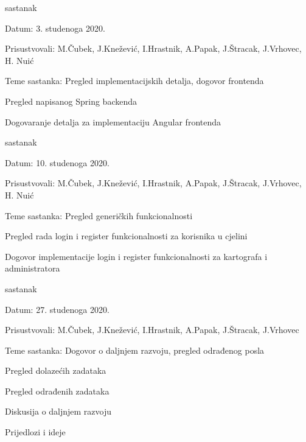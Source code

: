 \begin{packed_enum}
			\item  sastanak
			\item[] \begin{packed_item}
				\item Datum: 3. studenoga 2020.
				\item Prisustvovali: M.Čubek, J.Knežević, I.Hrastnik, A.Papak, J.Štracak, J.Vrhovec, H. Nuić
				\item Teme sastanka: Pregled implementacijskih detalja, dogovor frontenda
				\begin{packed_item}
					\item Pregled napisanog Spring backenda
					\item Dogovaranje detalja za implementaciju Angular frontenda
				\end{packed_item}
			\end{packed_item}
		
			\item  sastanak
			\item[] \begin{packed_item}
				\item Datum: 10. studenoga 2020.
				\item Prisustvovali: M.Čubek, J.Knežević, I.Hrastnik, A.Papak, J.Štracak, J.Vrhovec, H. Nuić
				\item Teme sastanka: Pregled generičkih funkcionalnosti
				\begin{packed_item}
					\item Pregled rada login i register funkcionalnosti za korisnika u cjelini
					\item Dogovor implementacije login i register funkcionalnosti za kartografa i administratora
				\end{packed_item}
			\end{packed_item}
		
			\item  sastanak
			\item[] \begin{packed_item}
				\item Datum: 27. studenoga 2020.
				\item Prisustvovali: M.Čubek, J.Knežević, I.Hrastnik, A.Papak, J.Štracak, J.Vrhovec
				\item Teme sastanka: Dogovor o daljnjem razvoju, pregled odrađenog posla
				\begin{packed_item}
					\item Pregled dolazećih zadataka
					\item Pregled odrađenih zadataka
					\item Diskusija o daljnjem razvoju
					\item Prijedlozi i ideje
				\end{packed_item}
			\end{packed_item}
		

\end{packed_enum}

